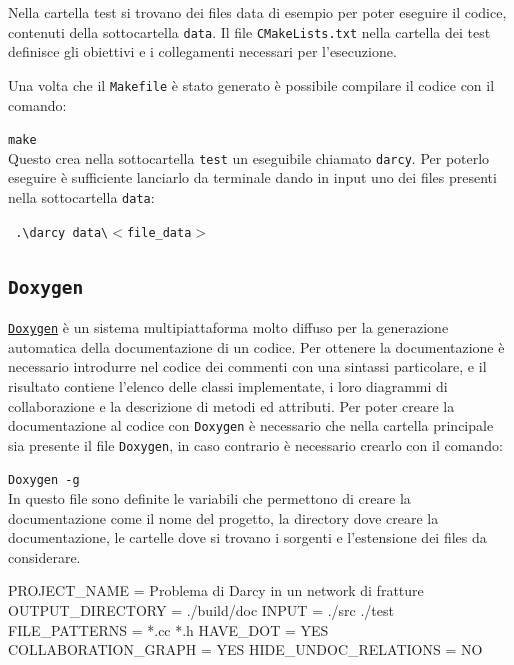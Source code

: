 \par \noindent Nella cartella test si trovano dei files data di esempio per poter eseguire il codice, contenuti della sottocartella \texttt{data}. Il file  \texttt{CMakeLists.txt} nella cartella dei test definisce gli obiettivi e i collegamenti necessari per l'esecuzione. 

\par Una volta che il \texttt{Makefile} è stato generato è possibile compilare il codice con il comando: \\ 
\par \texttt{make}\\

\noindent Questo crea nella sottocartella \texttt{test} un eseguibile chiamato \texttt{darcy}. Per poterlo eseguire è sufficiente lanciarlo da terminale dando in input uno dei files presenti nella sottocartella \texttt{data}:\\
\par \texttt{ .\textbackslash darcy data\textbackslash$<$file\_data$>$ }

\subsection{\texttt{Doxygen}}
\href{www.doxygen.org/}{\texttt{Doxygen}} è un sistema multipiattaforma molto diffuso per la generazione automatica della documentazione di un codice. Per ottenere la documentazione è necessario introdurre nel codice dei commenti con una sintassi particolare, e il risultato contiene l’elenco delle classi implementate, i loro diagrammi di collaborazione e la descrizione di metodi ed attributi.
Per poter creare la documentazione al codice con \texttt{Doxygen} è necessario che nella cartella principale sia presente il file \texttt{Doxygen}, in caso contrario è necessario crearlo con il comando:\\
\par \texttt{Doxygen -g}\\

\noindent In questo file sono definite le variabili che permettono di creare la documentazione come il nome del progetto, la directory dove creare la documentazione, le cartelle dove si trovano i sorgenti e l'estensione dei files da considerare.

\begin{Code03_01}
PROJECT_NAME 				=	 Problema di Darcy in un network di fratture
OUTPUT_DIRECTORY			=	./build/doc
INPUT						= 	./src ./test
FILE_PATTERNS				= 	*.cc *.h
HAVE_DOT					=	YES
COLLABORATION_GRAPH		=	YES
HIDE_UNDOC_RELATIONS		=	NO
\end{Code03_01}

